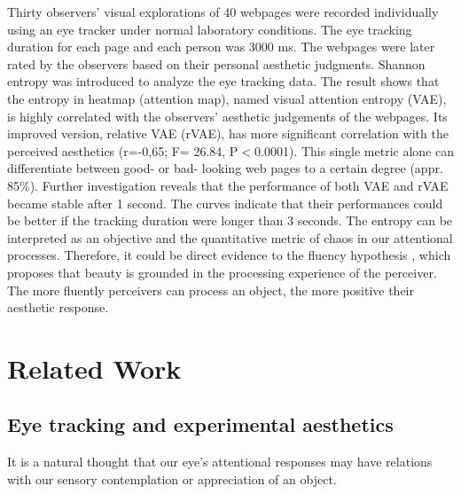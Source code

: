 Thirty observers' visual explorations of 40 webpages were recorded individually using an eye tracker under normal laboratory conditions. The eye tracking duration for each page and each person was 3000 ms.
The webpages were later rated by the observers based on their personal aesthetic judgments.
Shannon entropy was introduced to analyze the eye tracking data.
The result shows that the entropy in heatmap (attention map), named visual attention entropy (VAE), is highly correlated with the observers' aesthetic judgements of the webpages. Its improved version, relative VAE (rVAE), has more significant correlation with the perceived aesthetics (r=-0,65; F= 26.84, P$<$0.0001).
This single metric alone can differentiate between good- or bad- looking web pages to a certain degree (appr. 85\%). Further investigation reveals that the performance of both VAE and rVAE became stable after 1 second. The curves indicate that their performances could be better if the tracking duration were longer than 3 seconds.
The entropy can be interpreted as an objective and the quantitative metric of chaos in our attentional processes.
Therefore, it could be direct evidence to the fluency hypothesis \citep{Reber2004}, which proposes that beauty is grounded in the processing experience of the perceiver.
The more fluently perceivers can process an object, the more positive their aesthetic response.

\section{Related Work}
\label{sec:rel}
\subsection{Eye tracking and experimental aesthetics}
It is a natural thought that our eye's attentional responses may have relations with our sensory contemplation or appreciation of an object.

